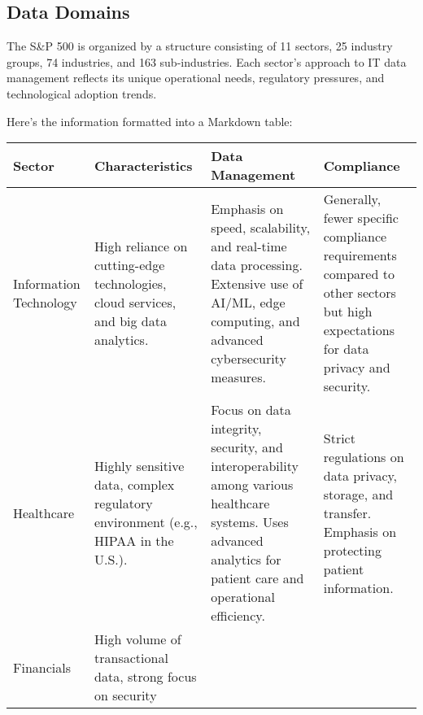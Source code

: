 \subsection{Data Domains}\label{data-domains}

The S\&P 500 is organized by a structure consisting of 11 sectors, 25
industry groups, 74 industries, and 163 sub-industries. Each sector's
approach to IT data management reflects its unique operational needs,
regulatory pressures, and technological adoption trends.

Here's the information formatted into a Markdown table:

\begin{longtable}[]{@{}
  >{\raggedright\arraybackslash}p{}
  >{\raggedright\arraybackslash}p{}
  >{\raggedright\arraybackslash}p{}
  >{\raggedright\arraybackslash}p{}@{}}
\toprule\noalign{}
\begin{minipage}[b]{\linewidth}\raggedright
Sector
\end{minipage} & \begin{minipage}[b]{\linewidth}\raggedright
Characteristics
\end{minipage} & \begin{minipage}[b]{\linewidth}\raggedright
Data Management
\end{minipage} & \begin{minipage}[b]{\linewidth}\raggedright
Compliance
\end{minipage} \\
\midrule\noalign{}
\endhead
\bottomrule\noalign{}
\endlastfoot
Information Technology & High reliance on cutting-edge technologies,
cloud services, and big data analytics. & Emphasis on speed,
scalability, and real-time data processing. Extensive use of AI/ML, edge
computing, and advanced cybersecurity measures. & Generally, fewer
specific compliance requirements compared to other sectors but high
expectations for data privacy and security. \\
Healthcare & Highly sensitive data, complex regulatory environment
(e.g., HIPAA in the U.S.). & Focus on data integrity, security, and
interoperability among various healthcare systems. Uses advanced
analytics for patient care and operational efficiency. & Strict
regulations on data privacy, storage, and transfer. Emphasis on
protecting patient information. \\
Financials & High volume of transactional data, strong focus on security

\end{longtable}
